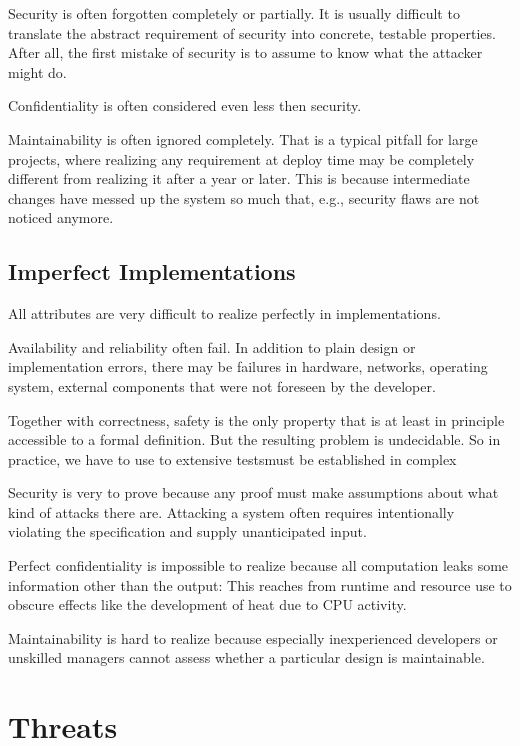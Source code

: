 Security is often forgotten completely or partially.
It is usually difficult to translate the abstract requirement of security into concrete, testable properties.
After all, the first mistake of security is to assume to know what the attacker might do.

Confidentiality is often considered even less then security.

Maintainability is often ignored completely.
That is a typical pitfall for large projects, where realizing any requirement at deploy time may be completely different from realizing it after a year or later.
This is because intermediate changes have messed up the system so much that, e.g., security flaws are not noticed anymore.

\subsection{Imperfect Implementations}

All attributes are very difficult to realize perfectly in implementations.

Availability and reliability often fail.
In addition to plain design or implementation errors, there may be failures in hardware, networks, operating system, external components that were not foreseen by the developer.

Together with correctness, safety is the only property that is at least in principle accessible to a formal definition.
But the resulting problem is undecidable.
So in practice, we have to use to extensive testsmust be established in complex 

Security is very to prove because any proof must make assumptions about what kind of attacks there are.
Attacking a system often requires intentionally violating the specification and supply unanticipated input.

Perfect confidentiality is impossible to realize because all computation leaks some information other than the output: This reaches from runtime and resource use to obscure effects like the development of heat due to CPU activity.

Maintainability is hard to realize because especially inexperienced developers or unskilled managers cannot assess whether a particular design is maintainable.

\section{Threats}

